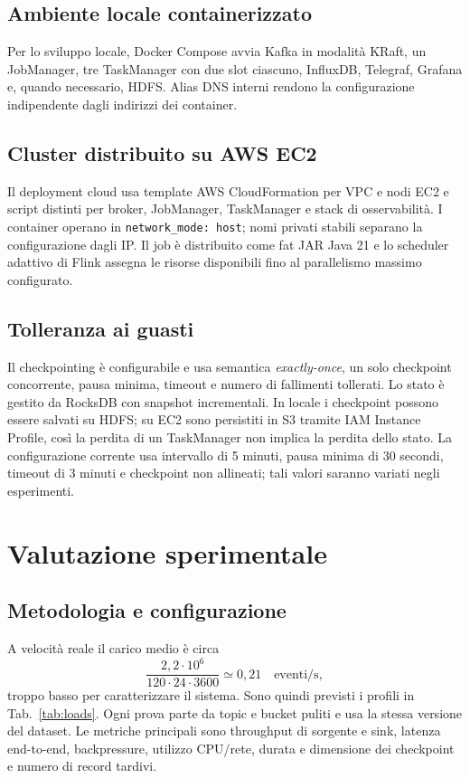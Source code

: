 \documentclass[conference]{IEEEtran}
\begin{document}
\subsection{Ambiente locale containerizzato}
Per lo sviluppo locale, Docker Compose avvia Kafka in modalità KRaft, un JobManager, tre TaskManager con due slot ciascuno, InfluxDB, Telegraf, Grafana e, quando necessario, HDFS. Alias DNS interni rendono la configurazione indipendente dagli indirizzi dei container.

\subsection{Cluster distribuito su AWS EC2}
Il deployment cloud usa template AWS CloudFormation per VPC e nodi EC2 e script distinti per broker, JobManager, TaskManager e stack di osservabilità. I container operano in \texttt{network\_mode: host}; nomi privati stabili separano la configurazione dagli IP. Il job è distribuito come fat JAR Java 21 e lo scheduler adattivo di Flink assegna le risorse disponibili fino al parallelismo massimo configurato.

\subsection{Tolleranza ai guasti}
Il checkpointing è configurabile e usa semantica \emph{exactly-once}, un solo checkpoint concorrente, pausa minima, timeout e numero di fallimenti tollerati. Lo stato è gestito da RocksDB con snapshot incrementali. In locale i checkpoint possono essere salvati su HDFS; su EC2 sono persistiti in S3 tramite IAM Instance Profile, così la perdita di un TaskManager non implica la perdita dello stato. La configurazione corrente usa intervallo di 5 minuti, pausa minima di 30 secondi, timeout di 3 minuti e checkpoint non allineati; tali valori saranno variati negli esperimenti.

\section{Valutazione sperimentale}\label{sec:evaluation}
\subsection{Metodologia e configurazione}
A velocità reale il carico medio è circa
\begin{equation}
\frac{2{,}2\cdot10^6}{120\cdot24\cdot3600}\simeq0{,}21
\quad\text{eventi/s},
\end{equation}
troppo basso per caratterizzare il sistema. Sono quindi previsti i profili in Tab.~\ref{tab:loads}. Ogni prova parte da topic e bucket puliti e usa la stessa versione del dataset. Le metriche principali sono throughput di sorgente e sink, latenza end-to-end, backpressure, utilizzo CPU/rete, durata e dimensione dei checkpoint e numero di record tardivi.
\end{document}
